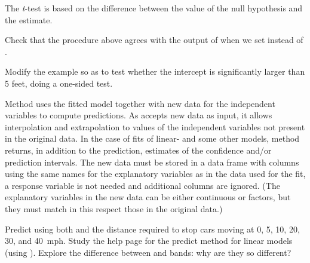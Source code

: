 \documentclass[krantz2]{krantz}\usepackage{knitr}
\begin{document}
\begin{explainbox}
The \emph{t}-test is based on the difference between the value of the null hypothesis and the estimate.

\begin{knitrout}\footnotesize
{}\color{fgcolor}\begin{kframe}
\begin{alltt}
 \hlkwb{<-} 
 \hlkwb{<-}  \hlopt{-}  \hlopt{/} 
 \hlkwb{<-}   
\end{alltt}
\end{kframe}
\end{knitrout}
\end{explainbox}

\begin{advplayground}
Check that the procedure above agrees with the output of  when we set  instead of .

Modify the example so as to test whether the intercept is significantly larger than 5 feet, doing a one-sided test.
\end{advplayground}

Method  uses the fitted model together with new data for the independent variables to compute predictions. As  accepts new data as input, it allows interpolation and extrapolation to values of the independent variables not present in the original data. In the case of fits of linear- and some other models, method  returns, in addition to the prediction, estimates of the confidence and/or prediction intervals. The new data must be stored in a data frame with columns using the same names for the explanatory variables as in the data used for the fit, a response variable is not needed and additional columns are ignored. (The explanatory variables in the new data can be either continuous or factors, but they must match in this respect those in the original data.)

\begin{advplayground}
Predict using both  and  the distance required to stop cars moving at 0, 5, 10, 20, 30, and 40~mph. Study the help page for the predict method for linear models (using ). Explore the difference between  and  bands: why are they so different?
\end{advplayground}
\end{document}
